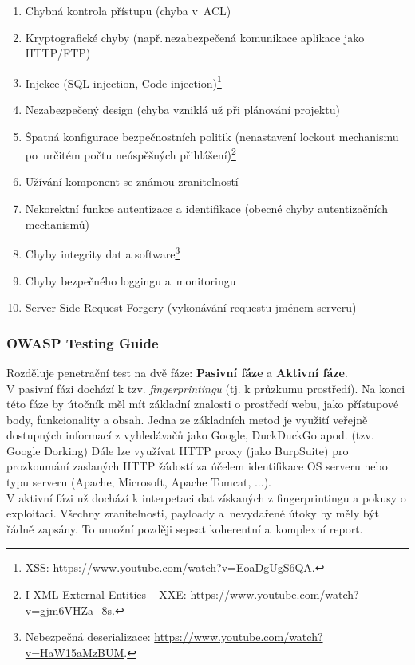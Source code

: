 \begin{enumerate}[noitemsep]
    \item Chybná kontrola přístupu (chyba v~ACL)
    \item Kryptografické chyby (např.\,nezabezpečená komunikace aplikace jako HTTP/FTP)
    \item Injekce (SQL injection, Code injection)\footnote{XSS: \url{https://www.youtube.com/watch?v=EoaDgUgS6QA}.}
    \item Nezabezpečený design (chyba vzniklá už při plánování projektu)
    \item Špatná konfigurace bezpečnostních politik (nenastavení lockout mechanismu po~určitém počtu neúspěšných přihlášení)\footnote{I XML External Entities -- XXE: \url{https://www.youtube.com/watch?v=gjm6VHZa_8s}.}
    \item Užívání komponent se známou zranitelností
    \item Nekorektní funkce autentizace a identifikace (obecné chyby autentizačních mechanismů)
    \item Chyby integrity dat a software\footnote{Nebezpečná deserializace: \url{https://www.youtube.com/watch?v=HaW15aMzBUM}.}
    \item Chyby bezpečného loggingu a~monitoringu
    \item Server-Side Request Forgery (vykonávání requestu jménem serveru)
\end{enumerate}


\subsubsection{OWASP Testing Guide}

Rozděluje penetrační test na dvě fáze: \textbf{Pasivní fáze} a \textbf{Aktivní fáze}.
\\

V pasivní fázi dochází k tzv. \textit{fingerprintingu} (tj. k průzkumu prostředí). Na konci této fáze by útočník měl mít základní znalosti o prostředí webu, jako přístupové body, funkcionality a obsah. Jedna ze základních metod je využití veřejně dostupných informací z vyhledávačů jako Google, DuckDuckGo apod. (tzv. Google Dorking) Dále lze využívat HTTP proxy (jako BurpSuite) pro prozkoumání zaslaných HTTP žádostí za účelem identifikace OS serveru nebo typu serveru (Apache, Microsoft, Apache Tomcat, ...).
\\

V aktivní fázi už dochází k interpetaci dat získaných z fingerprintingu a pokusy o exploitaci. Všechny zranitelnosti, payloady a~nevydařené útoky by měly být řádně zapsány. To umožní později sepsat koherentní a~komplexní report.

